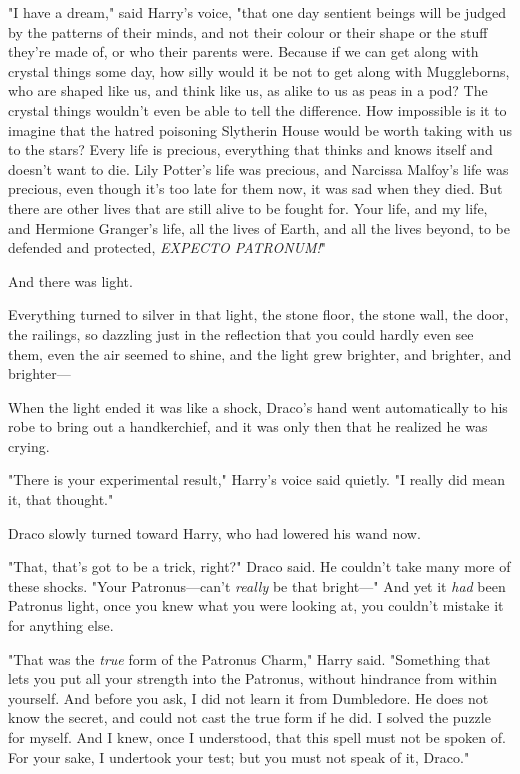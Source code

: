 "I have a dream," said Harry’s voice, "that one day sentient beings will be
judged by the patterns of their minds, and not their colour or their shape or
the stuff they’re made of, or who their parents were. Because if we can get
along with crystal things some day, how silly would it be not to get along with
Muggleborns, who are shaped like us, and think like us, as alike to us as peas
in a pod? The crystal things wouldn’t even be able to tell the difference. How
impossible is it to imagine that the hatred poisoning Slytherin House would be
worth taking with us to the stars? Every life is precious, everything that
thinks and knows itself and doesn’t want to die. Lily Potter’s life was
precious, and Narcissa Malfoy’s life was precious, even though it’s too late
for them now, it was sad when they died. But there are other lives that are
still alive to be fought for. Your life, and my life, and Hermione Granger’s
life, all the lives of Earth, and all the lives beyond, to be defended and
protected, \emph{EXPECTO PATRONUM!}"

And there was light.

Everything turned to silver in that light, the stone floor, the stone wall, the
door, the railings, so dazzling just in the reflection that you could hardly
even see them, even the air seemed to shine, and the light grew brighter, and
brighter, and brighter—

When the light ended it was like a shock, Draco’s hand went automatically to
his robe to bring out a handkerchief, and it was only then that he realized he
was crying.

"There is your experimental result," Harry’s voice said quietly. "I really did
mean it, that thought."

Draco slowly turned toward Harry, who had lowered his wand now.

"That, that’s got to be a trick, right?" Draco said. He couldn’t take many more
of these shocks. "Your Patronus—can’t \emph{really} be that bright—" And
yet it \emph{had} been Patronus light, once you knew what you were looking at,
you couldn’t mistake it for anything else.

"That was the \emph{true} form of the Patronus Charm," Harry said. "Something
that lets you put all your strength into the Patronus, without hindrance from
within yourself. And before you ask, I did not learn it from Dumbledore. He
does not know the secret, and could not cast the true form if he did. I solved
the puzzle for myself. And I knew, once I understood, that this spell must not
be spoken of. For your sake, I undertook your test; but you must not speak of
it, Draco."

